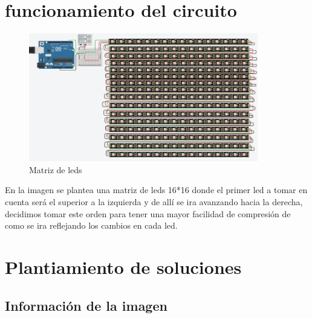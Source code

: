 \documentclass{article}
\begin{document}
\section{funcionamiento del circuito} \label{contenido}

\begin{figure}[h]
\includegraphics[width=10cm]{Simulación.png}
\centering
\caption{Matriz de leds}
\label{fig:matriz de leds}
\end{figure}

\label{contenio}
En la imagen se plantea una matriz de leds 16*16 donde el primer led a tomar en cuenta será el superior a la izquierda y de allí se ira avanzando hacia la derecha, decidimos tomar este orden para tener una mayor facilidad de compresión de como se ira reflejando los cambios en cada led.



\section{Plantiamiento de soluciones }

\subsection{Información de la imagen  }
\end{document}
